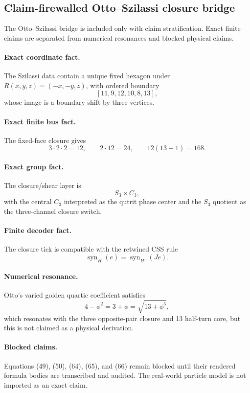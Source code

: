 \subsection{Claim-firewalled Otto--Szilassi closure bridge}
\label{sec:bt1457-claim-firewalled-otto-szilassi}

The Otto--Szilassi bridge is included only with claim stratification.  Exact
finite claims are separated from numerical resonances and blocked physical
claims.

\paragraph{Exact coordinate fact.}
The Szilassi data contain a unique fixed hexagon under
\(R(x,y,z)=(-x,-y,z)\), with ordered boundary
\[
[11,9,12,10,8,13],
\]
whose image is a boundary shift by three vertices.

\paragraph{Exact finite bus fact.}
The fixed-face closure gives
\[
3\cdot2\cdot2=12,
\qquad 2\cdot12=24,
\qquad 12(13+1)=168.
\]

\paragraph{Exact group fact.}
The closure/shear layer is
\[
S_3\times C_3,
\]
with the central \(C_3\) interpreted as the qutrit phase center and the \(S_3\)
quotient as the three-channel closure switch.

\paragraph{Finite decoder fact.}
The closure tick is compatible with the retwined CSS rule
\[
\operatorname{syn}_{H}(e)=\operatorname{syn}_{H'}(Je).
\]

\paragraph{Numerical resonance.}
Otto's varied golden quartic coefficient satisfies
\[
4-\phi^2=3+\phi=\sqrt{13+\phi^5},
\]
which resonates with the three opposite-pair closure and 13 half-turn core, but
this is not claimed as a physical derivation.

\paragraph{Blocked claims.}
Equations (49), (50), (64), (65), and (66) remain blocked until their rendered
formula bodies are transcribed and audited.  The real-world particle model is
not imported as an exact claim.
